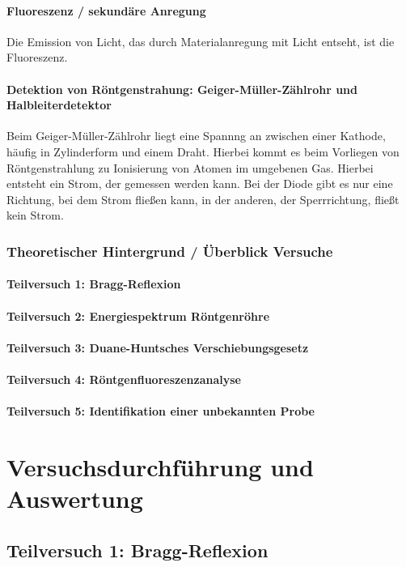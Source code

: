 \documentclass[12pt,oneside,oldfontcommands]{memoir}
\begin{document}
\paragraph{Fluoreszenz / sekundäre Anregung}
Die Emission von Licht, das durch Materialanregung mit Licht entseht, ist die Fluoreszenz.

\paragraph{Detektion von Röntgenstrahung: Geiger-Müller-Zählrohr und Halbleiterdetektor}
Beim Geiger-Müller-Zählrohr liegt eine Spannng an zwischen einer Kathode, häufig in Zylinderform und einem Draht. Hierbei kommt es beim Vorliegen von Röntgenstrahlung zu Ionisierung von Atomen im umgebenen Gas. Hierbei entsteht ein Strom, der gemessen werden kann. Bei der Diode gibt es nur eine Richtung, bei dem Strom fließen kann, in der anderen, der Sperrrichtung, fließt kein Strom.

\subsubsection{Theoretischer Hintergrund / Überblick Versuche}
\paragraph{Teilversuch 1: Bragg-Reflexion}
\paragraph{Teilversuch 2: Energiespektrum Röntgenröhre}
\paragraph{Teilversuch 3: Duane-Huntsches Verschiebungsgesetz}
\paragraph{Teilversuch 4: Röntgenfluoreszenzanalyse}
\paragraph{Teilversuch 5: Identifikation einer unbekannten Probe}

\section{Versuchsdurchführung und Auswertung}
\subsection{Teilversuch 1: Bragg-Reflexion}
\end{document}
